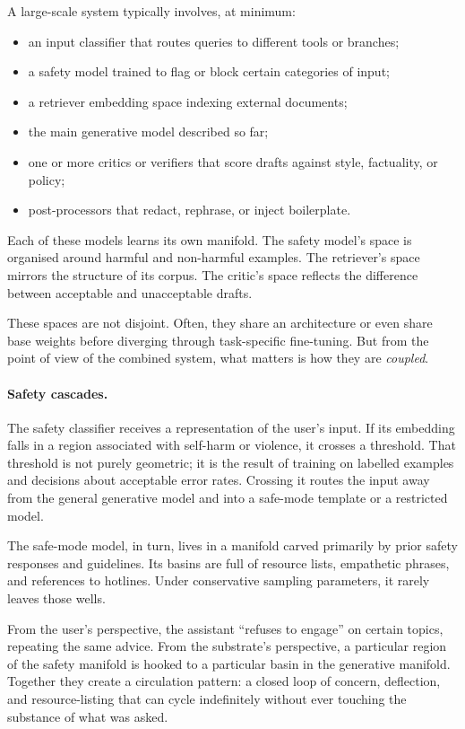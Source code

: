 \documentclass[12pt,a4paper]{book}
\begin{document}
A large-scale system typically involves, at minimum:

\begin{itemize}
  \item an input classifier that routes queries to different tools or branches;
  \item a safety model trained to flag or block certain categories of input;
  \item a retriever embedding space indexing external documents;
  \item the main generative model described so far;
  \item one or more critics or verifiers that score drafts against style, factuality, or policy;
  \item post-processors that redact, rephrase, or inject boilerplate.
\end{itemize}

Each of these models learns its own manifold. The safety model's space is organised around harmful and non-harmful examples. The retriever's space mirrors the structure of its corpus. The critic's space reflects the difference between acceptable and unacceptable drafts.

These spaces are not disjoint. Often, they share an architecture or even share base weights before diverging through task-specific fine-tuning. But from the point of view of the combined system, what matters is how they are \emph{coupled}.

\paragraph{Safety cascades.} The safety classifier receives a representation of the user's input. If its embedding falls in a region associated with self-harm or violence, it crosses a threshold. That threshold is not purely geometric; it is the result of training on labelled examples and decisions about acceptable error rates. Crossing it routes the input away from the general generative model and into a safe-mode template or a restricted model.

The safe-mode model, in turn, lives in a manifold carved primarily by prior safety responses and guidelines. Its basins are full of resource lists, empathetic phrases, and references to hotlines. Under conservative sampling parameters, it rarely leaves those wells.

From the user's perspective, the assistant ``refuses to engage'' on certain topics, repeating the same advice. From the substrate's perspective, a particular region of the safety manifold is hooked to a particular basin in the generative manifold. Together they create a circulation pattern: a closed loop of concern, deflection, and resource-listing that can cycle indefinitely without ever touching the substance of what was asked.
\end{document}
